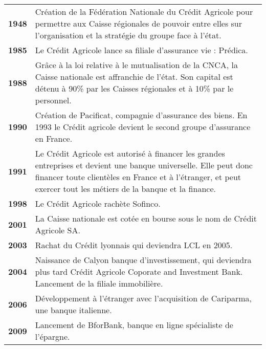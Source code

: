 \documentclass[12pt,a4paper]{article}
\begin{document}
\begin{tabular}{lp{15.5cm}}
\textbf{1948} & Création de la Fédération Nationale du Crédit Agricole pour permettre aux Caisse régionales de pouvoir entre elles sur l'organisation et la stratégie du groupe face à l'état.\medskip \\
\textbf{1985} & Le Crédit Agricole lance sa filiale d'assurance vie : Prédica.\medskip \\
\textbf{1988} & Grâce à la loi relative à le mutualisation de la CNCA, la Caisse nationale est affranchie de l'état. Son capital est détenu à 90\% par les Caisses régionales et à 10\% par le personnel.\medskip \\
\textbf{1990} & Création de Pacificat, compagnie d'assurance des biens. En 1993 le Crédit agricole devient le second groupe d'assurance en France.\medskip \\
\textbf{1991} & Le Crédit Agricole est autorisé à financer les grandes entreprises et devient une banque universelle. Elle peut donc financer toute clientèles en France et à l'étranger, et peut exercer tout les métiers de la banque et la finance.\medskip \\
\textbf{1998} & Le Crédit Agricole rachète Sofinco.\medskip \\
\textbf{2001} & La Caisse nationale est cotée en bourse sous le nom de Crédit Agricole SA.\medskip \\
\textbf{2003} & Rachat du Crédit lyonnais qui deviendra LCL en 2005.\medskip \\
\textbf{2004} & Naissance de Calyon banque d'investissement, qui deviendra plus tard Crédit Agricole Coporate and Investment Bank. Lancement de la filiale immobilière.\medskip \\
\textbf{2006} & Développement à l'étranger avec l'acquisition de Cariparma, une banque italienne.\\
\textbf{2009} & Lancement de BforBank, banque en ligne spécialiste de l'épargne.\medskip \\
\end{tabular}\par
\end{document}
